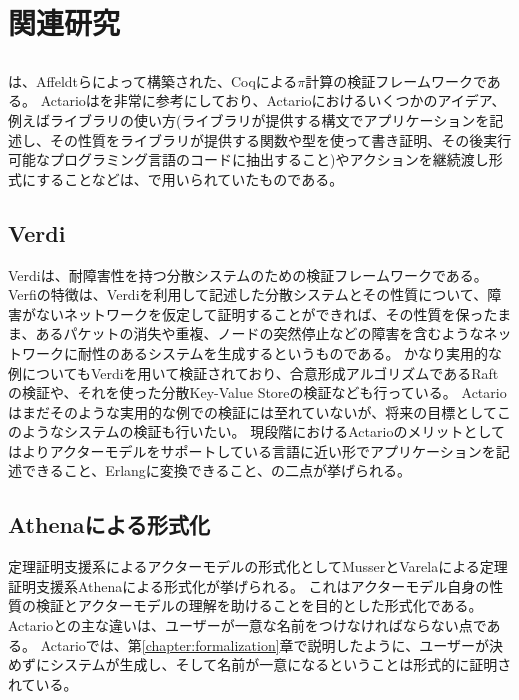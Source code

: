\chapter{関連研究}
\label{chapter:related-work}

\section{\applpi}

\applpi\cite{Affeldt200817}は、Affeldtらによって構築された、Coqによる$\pi$計算の検証フレームワークである。
Actarioは\applpi を非常に参考にしており、Actarioにおけるいくつかのアイデア、例えばライブラリの使い方(ライブラリが提供する構文でアプリケーションを記述し、その性質をライブラリが提供する関数や型を使って書き証明、その後実行可能なプログラミング言語のコードに抽出すること)やアクションを継続渡し形式にすることなどは、\applpi で用いられていたものである。

\section{Verdi}

Verdi\cite{Verdi}は、耐障害性を持つ分散システムのための検証フレームワークである。
Verfiの特徴は、Verdiを利用して記述した分散システムとその性質について、障害がないネットワークを仮定して証明することができれば、その性質を保ったまま、あるパケットの消失や重複、ノードの突然停止などの障害を含むようなネットワークに耐性のあるシステムを生成するというものである。
かなり実用的な例についてもVerdiを用いて検証されており、合意形成アルゴリズムであるRaftの検証や、それを使った分散Key-Value Storeの検証なども行っている。
Actarioはまだそのような実用的な例での検証には至れていないが、将来の目標としてこのようなシステムの検証も行いたい。
現段階におけるActarioのメリットとしてはよりアクターモデルをサポートしている言語に近い形でアプリケーションを記述できること、Erlangに変換できること、の二点が挙げられる。


\section{Athenaによる形式化}

定理証明支援系によるアクターモデルの形式化としてMusserとVarelaによる定理証明支援系Athena\cite{Athena}による形式化\cite{Musser:2013aa}が挙げられる。
これはアクターモデル自身の性質の検証とアクターモデルの理解を助けることを目的とした形式化である。
Actarioとの主な違いは、ユーザーが一意な名前をつけなければならない点である。
Actarioでは、第\ref{chapter:formalization}章で説明したように、ユーザーが決めずにシステムが生成し、そして名前が一意になるということは形式的に証明されている。

